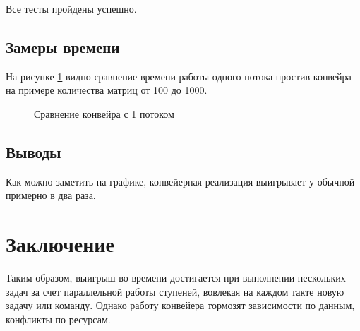 \documentclass[a4paper,12pt]{article}
\newcommand{\anonsection}[1]{\section*{#1}\addcontentsline{toc}{section}{#1}}
\begin{document}
Все тесты пройдены успешно.

\subsection{Замеры времени}

На рисунке \ref{img:graph} видно сравнение времени работы одного потока простив
конвейра на примере количества матриц от 100 до 1000.

\begin{figure}[H]
    \caption{Сравнение конвейра с 1 потоком}
    \label{img:graph}
\end{figure}

\subsection{Выводы}

Как можно заметить на графике, конвейерная реализация выигрывает у обычной
примерно в два раза.

\newpage
\anonsection{Заключение}

Таким образом, выигрыш во времени достигается при  выполнении нескольких задач за счет параллельной   работы   ступеней,  вовлекая  на  каждом такте новую задачу или команду. Однако работу конвейера тормозят зависимости  по данным, конфликты по ресурсам. 
\end{document}
